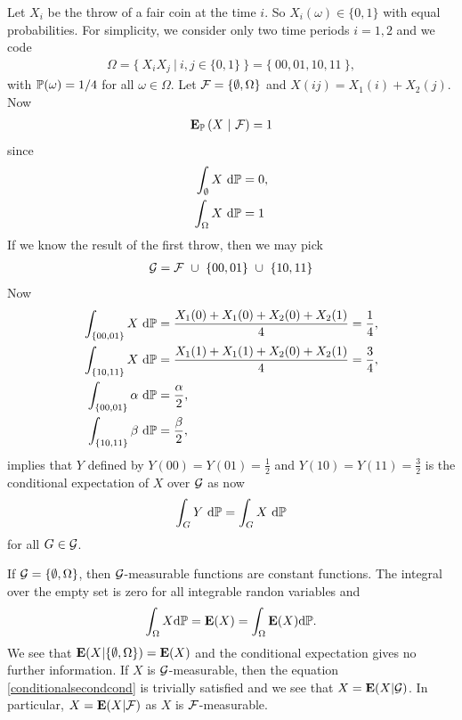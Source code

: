 Let $X_i$ be the throw of a fair coin at the time $i$. So $X_i (\omega) \in \{ 0, 1\}$ with equal probabilities. For simplicity, we consider only two time periods $i=1,2$ and we code 
	\begin{align}
		\Omega = \{ \ X_iX_j \ | \ i,j \in \{0,1\} \ \} = \{ \ 00, 01, 10, 11 \ \},
	\end{align} 
with $\mathbb{P}( \omega ) = 1/4$ for all $\omega \in \Omega$. Let $\mathcal{F} = \{ \emptyset, \Omega \}$ and $X(ij)= X_1(i)+X_2(j)$. Now
\begin{align}
\operatorname{\boldsymbol{\mathrm{E}}}_{\mathbb{P}} \left( X \ | \ \mathcal{F} \right) = 1
\end{align}
since
	\begin{align}
		\int_\emptyset X \ \mathrm{d} \mathbb{P} &= 0, \\
		\int_\Omega X \ \mathrm{d} \mathbb{P} &= 1 \\
	\end{align}
If we know the result of the first throw, then we may pick 
	\begin{align}
		\mathcal{G} = \mathcal{F} \ \cup \ \{ 00, 01 \} \ \cup \ \{ 10, 11 \}
	\end{align} 
Now
	\begin{align}
		\int_{ \{ 00, 01 \} } X \ \mathrm{d} \mathbb{P} &= \frac{X_1(0) + X_1(0) + X_2(0) + X_2(1)}{4} = \frac{1}{4}, \\
		\int_{ \{ 10, 11 \} } X \ \mathrm{d} \mathbb{P} &= \frac{X_1(1) + X_1(1) + X_2(0) + X_2(1)}{4} = \frac{3}{4}, \\
		\int_{ \{ 00, 01 \} } \alpha \ \mathrm{d} \mathbb{P} &= \frac{\alpha}{2}, \\
		\int_{ \{ 10, 11 \} } \beta \ \mathrm{d} \mathbb{P} &= \frac{\beta}{2}, \\
	\end{align}
implies that  $Y$ defined by $Y(00) = Y(01) = \frac{1}{2}$ and $Y(10) = Y(11) = \frac{3}{2}$ is the conditional expectation of $X$ over $\mathcal{G}$ as now
	\begin{align}
		\int_G Y \ \mathrm{d} \mathbb{P} = \int_G X \ \mathrm{d} \mathbb{P}
	\end{align}
for all $G \in \mathcal{G}$.

If $\mathcal{G} = \{ \emptyset, \Omega \}$, then $\mathcal{G}$-measurable functions are constant functions. The integral over the empty set is zero for all integrable randon variables and 
      \begin{align}
        \int_{\Omega} X \mathrm{d} \mathbb{P} = \operatorname{\boldsymbol{\mathrm{E}}} (X) = \int_{\Omega} \operatorname{\boldsymbol{\mathrm{E}}} (X) \mathrm{d} \mathbb{P}.
      \end{align}
We see that $\operatorname{\boldsymbol{\mathrm{E}}} (X | \{ \emptyset, \Omega \}) = \operatorname{\boldsymbol{\mathrm{E}}} (X)$ and the conditional expectation gives no further information. If $X$ is $\mathcal{G}$-measurable, then the equation \ref{conditionalsecondcond} is trivially satisfied and we see that $X = \operatorname{\boldsymbol{\mathrm{E}}} (X | \mathcal{G})$. In particular, $X = \operatorname{\boldsymbol{\mathrm{E}}} (X | \mathcal{F})$ as $X$ is $\mathcal{F}$-measurable.

